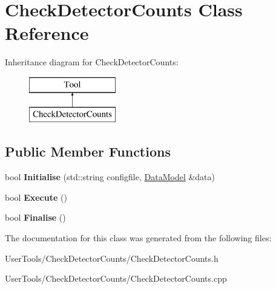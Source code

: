 \hypertarget{classCheckDetectorCounts}{\section{Check\-Detector\-Counts Class Reference}
\label{classCheckDetectorCounts}
}
Inheritance diagram for Check\-Detector\-Counts\-:\begin{figure}[H]
\begin{center}
\leavevmode
\includegraphics[height=2.000000cm]{classCheckDetectorCounts}
\end{center}
\end{figure}
\subsection*{Public Member Functions}
\begin{DoxyCompactItemize}
\item 
\hypertarget{classCheckDetectorCounts_ac64b90d8952c7d3b1f970c7f7d6180df}{bool {\bfseries Initialise} (std\-::string configfile, \hyperlink{classDataModel}{Data\-Model} \&data)}\label{classCheckDetectorCounts_ac64b90d8952c7d3b1f970c7f7d6180df}

\item 
\hypertarget{classCheckDetectorCounts_a5e10b7af8ac4184d2cfc695b47e5c23d}{bool {\bfseries Execute} ()}\label{classCheckDetectorCounts_a5e10b7af8ac4184d2cfc695b47e5c23d}

\item 
\hypertarget{classCheckDetectorCounts_a7fb977a13d93552a7e7feefd9a419125}{bool {\bfseries Finalise} ()}\label{classCheckDetectorCounts_a7fb977a13d93552a7e7feefd9a419125}

\end{DoxyCompactItemize}


The documentation for this class was generated from the following files\-:\begin{DoxyCompactItemize}
\item 
User\-Tools/\-Check\-Detector\-Counts/Check\-Detector\-Counts.\-h\item 
User\-Tools/\-Check\-Detector\-Counts/Check\-Detector\-Counts.\-cpp\end{DoxyCompactItemize}
